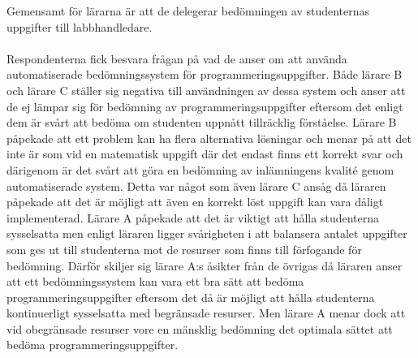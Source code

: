 \documentclass[a4paper,11pt]{article}
\begin{document}
{Gemensamt för lärarna är att de delegerar bedömningen av studenternas uppgifter till labbhandledare. 
\\
\\
Respondenterna fick besvara frågan på vad de anser om att använda automatiserade bedömningssystem för programmeringsuppgifter. Både lärare B och lärare C ställer sig negativa till användningen av dessa system och anser att de ej lämpar sig för bedömning av programmeringsuppgifter eftersom det enligt dem är svårt att bedöma om studenten uppnått tillräcklig förståelse.
Lärare B påpekade att ett problem kan ha flera alternativa lösningar och menar på att det inte är som vid en matematisk uppgift där det endast finns ett korrekt svar och därigenom är det svårt att göra en bedömning av inlämningens kvalité genom automatiserade system. Detta var något som även lärare C ansåg då läraren påpekade att det är möjligt att även en korrekt löst uppgift kan vara dåligt implementerad.
Lärare A påpekade att det är viktigt att hålla studenterna sysselsatta men enligt läraren ligger svårigheten i att balansera antalet uppgifter som ges ut till studenterna mot de resurser som finns till förfogande för bedömning. Därför skiljer sig lärare A:s åsikter från de övrigas då läraren anser att ett bedömningssystem kan vara ett bra sätt att bedöma programmeringsuppgifter eftersom det då är möjligt att hålla studenterna kontinuerligt sysselsatta med begränsade resurser. Men lärare A menar dock att vid obegränsade resurser vore en mänsklig bedömning det optimala sättet att bedöma programmeringsuppgifter.

}
\end{document}
